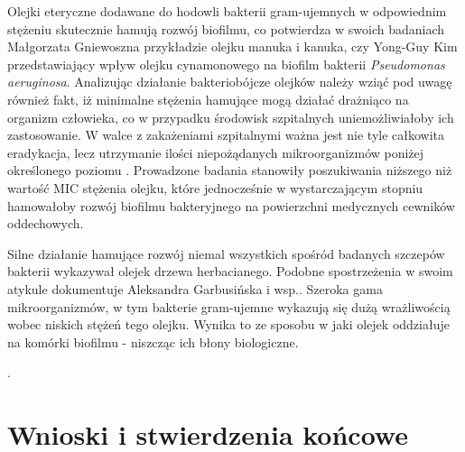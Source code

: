 \documentclass[11pt,a4paper]{report}
\begin{document}
Olejki eteryczne dodawane do hodowli bakterii gram-ujemnych w odpowiednim stężeniu skutecznie hamują rozwój biofilmu, co potwierdza w swoich badaniach Małgorzata Gniewosz\cite{manukaikanuka}na przykładzie olejku manuka i kanuka, czy Yong-Guy Kim\cite{kim} przedstawiający wpływ olejku cynamonowego na biofilm bakterii \textit{Pseudomonas aeruginosa}.  
Analizując działanie bakteriobójcze olejków należy wziąć pod uwagę również fakt, iż minimalne stężenia hamujące mogą działać drażniąco na organizm człowieka, co w przypadku środowisk szpitalnych uniemożliwiałoby ich zastosowanie. 
W walce z zakażeniami szpitalnymi ważna jest nie tyle całkowita eradykacja, lecz utrzymanie ilości niepożądanych mikroorganizmów poniżej określonego poziomu \cite{zakszpit16}. 
Prowadzone badania stanowiły poszukiwania niższego niż wartość MIC stężenia olejku, które jednocześnie w wystarczającym stopniu hamowałoby rozwój biofilmu bakteryjnego na powierzchni medycznych cewników oddechowych.

Silne działanie hamujące rozwój niemal wszystkich spośród badanych szczepów bakterii wykazywał olejek drzewa herbacianego. Podobne spostrzeżenia w swoim atykule dokumentuje Aleksandra Garbusińska i wsp.\cite{drzewo1, drzewo2}. Szeroka gama mikroorganizmów, w tym bakterie gram-ujemne wykazują się dużą wrażliwością wobec niskich stężeń tego olejku. Wynika to ze sposobu w jaki olejek oddziałuje na komórki biofilmu - niszcząc ich błony biologiczne.

\clearpage
.



\clearpage

\chapter{Wnioski i stwierdzenia końcowe}
\end{document}
